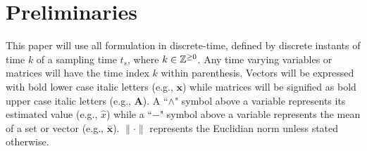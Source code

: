 
\section{Preliminaries} \label{sec:preliminaries}

This paper will use all formulation in discrete-time, defined by discrete instants of time $k$ of a sampling time $t_s$, where $k \in \mathbb{Z}^{\geq0}$. Any time varying variables or matrices will have the time index $k$ within parenthesis. Vectors will be expressed with bold lower case italic letters (e.g., $\bm{x}$) while matrices will be signified as bold upper case italic letters (e.g., $\bm{A}$). A ``$\wedge$" symbol above a variable represents its estimated value (e.g., $\hat{x}$) while a ``$-$" symbol above a variable represents the mean of a set or vector (e.g., $\bar{\bm{x}}$). $\lVert\cdot\rVert$ represents the Euclidian norm unless stated otherwise.

